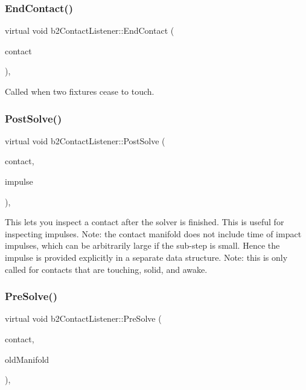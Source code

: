 \subsubsection{\texorpdfstring{EndContact()}{EndContact()}}
{\footnotesize\ttfamily virtual void b2\+Contact\+Listener\+::\+End\+Contact (\begin{DoxyParamCaption}\item[{\mbox{\hyperlink{classb2_contact}{b2\+Contact}} $\ast$}]{contact }\end{DoxyParamCaption})\hspace{0.3cm}{\ttfamily [inline]}, {\ttfamily [virtual]}}



Called when two fixtures cease to touch. 

\mbox{\label{classb2_contact_listener_acd58ec96f7569b95eec65b8ca3f8013d}} 
\subsubsection{\texorpdfstring{PostSolve()}{PostSolve()}}
{\footnotesize\ttfamily virtual void b2\+Contact\+Listener\+::\+Post\+Solve (\begin{DoxyParamCaption}\item[{\mbox{\hyperlink{classb2_contact}{b2\+Contact}} $\ast$}]{contact,  }\item[{const \mbox{\hyperlink{structb2_contact_impulse}{b2\+Contact\+Impulse}} $\ast$}]{impulse }\end{DoxyParamCaption})\hspace{0.3cm}{\ttfamily [inline]}, {\ttfamily [virtual]}}

This lets you inspect a contact after the solver is finished. This is useful for inspecting impulses. Note\+: the contact manifold does not include time of impact impulses, which can be arbitrarily large if the sub-\/step is small. Hence the impulse is provided explicitly in a separate data structure. Note\+: this is only called for contacts that are touching, solid, and awake. \mbox{\label{classb2_contact_listener_a416f85eb45a1099053402b15a19a7de0}} 
\subsubsection{\texorpdfstring{PreSolve()}{PreSolve()}}
{\footnotesize\ttfamily virtual void b2\+Contact\+Listener\+::\+Pre\+Solve (\begin{DoxyParamCaption}\item[{\mbox{\hyperlink{classb2_contact}{b2\+Contact}} $\ast$}]{contact,  }\item[{const \mbox{\hyperlink{structb2_manifold}{b2\+Manifold}} $\ast$}]{old\+Manifold }\end{DoxyParamCaption})\hspace{0.3cm}{\ttfamily [inline]}, {\ttfamily [virtual]}}

